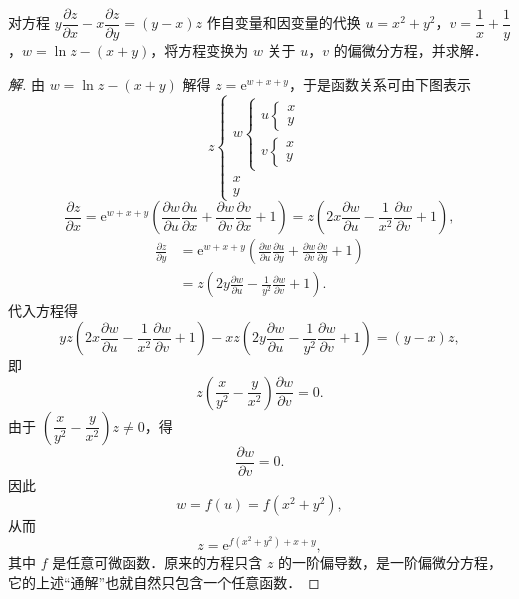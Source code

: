 \begin{example}\label{ex:16-2-6}
对方程 $y\dfrac{\partial z}{\partial x}-x\dfrac{\partial z}{\partial y}=(y-x)z$ 作自变量和因变量的代换 $u=x^{2}+y^{2}$，$v=\dfrac{1}{x}+\dfrac{1}{y}$，$w=\ln z-(x+y)$，将方程变换为 $w$ 关于 $u$，$v$ 的偏微分方程，并求解．
\end{example}

\begin{proof}[解]
由 $w=\ln z-(x+y)$ 解得 $z=\mathrm{e}^{w+x+y}$，于是函数关系可由下图表示
\[
z\left\{\begin{array}{l}w\left\{\begin{array}{l}u\left\{\begin{array}{l}x\\ y\end{array}\right.\\[4pt] v\left\{\begin{array}{l}x\\ y\end{array}\right.\end{array}\right.\\[6pt] x\\[2pt] y\end{array}\right.
\]
\[
\frac{\partial z}{\partial x}=\mathrm{e}^{w+x+y}\left(\frac{\partial w}{\partial u}\frac{\partial u}{\partial x}+\frac{\partial w}{\partial v}\frac{\partial v}{\partial x}+1\right)=z\left(2x\frac{\partial w}{\partial u}-\frac{1}{x^{2}}\frac{\partial w}{\partial v}+1\right),
\]
\[
\begin{aligned}
\frac{\partial z}{\partial y}&=\mathrm{e}^{w+x+y}\left(\frac{\partial w}{\partial u}\frac{\partial u}{\partial y}+\frac{\partial w}{\partial v}\frac{\partial v}{\partial y}+1\right)\\
&=z\left(2y\frac{\partial w}{\partial u}-\frac{1}{y^{2}}\frac{\partial w}{\partial v}+1\right).
\end{aligned}
\]
代入方程得
\[
yz\left(2x\frac{\partial w}{\partial u}-\frac{1}{x^{2}}\frac{\partial w}{\partial v}+1\right)-xz\left(2y\frac{\partial w}{\partial u}-\frac{1}{y^{2}}\frac{\partial w}{\partial v}+1\right)=(y-x)z,
\]
即
\[
z\left(\frac{x}{y^{2}}-\frac{y}{x^{2}}\right)\frac{\partial w}{\partial v}=0.
\]
由于 $\left(\dfrac{x}{y^{2}}-\dfrac{y}{x^{2}}\right)z\neq 0$，得
\[
\frac{\partial w}{\partial v}=0.
\]
因此
\[
w=f(u)=f(x^{2}+y^{2}),
\]
从而
\[
z=\mathrm{e}^{f(x^{2}+y^{2})+x+y},
\]
其中 $f$ 是任意可微函数．原来的方程只含 $z$ 的一阶偏导数，是一阶偏微分方程，它的上述``通解''也就自然只包含一个任意函数．
\end{proof}


